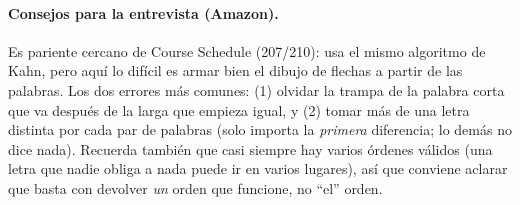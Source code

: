 \paragraph{Consejos para la entrevista (Amazon).} Es pariente cercano de Course
Schedule (207/210): usa el mismo algoritmo de Kahn, pero aquí lo difícil es
armar bien el dibujo de flechas a partir de las palabras. Los dos errores más
comunes: (1) olvidar la trampa de la palabra corta que va después de la larga
que empieza igual, y (2) tomar más de una letra distinta por cada par de
palabras (solo importa la \emph{primera} diferencia; lo demás no dice nada).
Recuerda también que casi siempre hay varios órdenes válidos (una letra que
nadie obliga a nada puede ir en varios lugares), así que conviene aclarar que
basta con devolver \emph{un} orden que funcione, no ``el'' orden.

